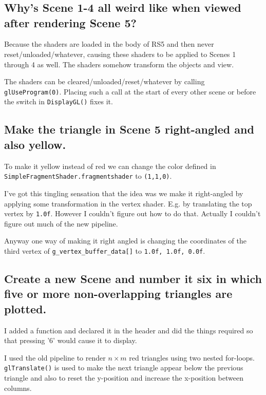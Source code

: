 \section{} %

\subsection{Why's Scene 1-4 all weird like when viewed after rendering Scene 5?}
Because the shaders are loaded in the body of RS5 and then never reset/unloaded/whatever, causing these shaders to be applied to Scenes 1 through 4 as well.
The shaders somehow transform the objects and view.

The shaders can be cleared/unloaded/reset/whatever by calling \texttt{glUseProgram(0)}.
Placing such a call at the start of every other scene or before the switch in \texttt{DisplayGL()} fixes it.

\subsection{Make the triangle in Scene 5 right-angled and also yellow.}
To make it yellow instead of red we can change the color defined in \texttt{SimpleFragmentShader.fragmentshader} to \texttt{(1,1,0)}.

I've got this tingling sensation that the idea was we make it right-angled by applying some transformation in the vertex shader.
E.g. by translating the top vertex by \texttt{1.0f}.
However I couldn't figure out how to do that.
Actually I couldn't figure out much of the new pipeline.

Anyway one way of making it right angled is changing the coordinates of the third vertex of \texttt{g\_vertex\_buffer\_data[]} to \texttt{1.0f, 1.0f, 0.0f}.

\subsection{Create a new Scene and number it six in which five or more non-overlapping triangles are plotted.}
I added a function and declared it in the header and did the things required so that pressing '6' would cause it to display.

I used the old pipeline to render $n\times m$ red triangles using two nested for-loops.
\texttt{glTranslate()} is used to make the next triangle appear below the previous triangle and also to reset the y-position and increase the x-position between columns.

